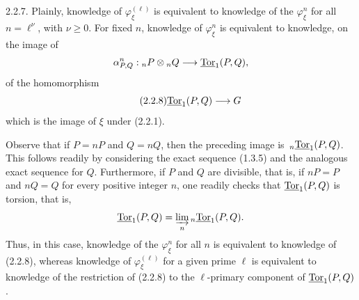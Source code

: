 2.2.7. Plainly, knowledge of $\varphi^{(\ell)}_\xi$ is equivalent
to knowledge of the $\varphi^n_\xi$ for all $n=\ell^\nu$, with
$\nu\geq0$.  For fixed $n$, knowledge of $\varphi^n_\xi$ is
equivalent to knowledge, on the image of
\[
 \alpha^n_{P,Q}:{}_nP\otimes{}_nQ\longrightarrow\uTor_1(P,Q),
\]
of the homomorphism
\begin{equation}\tag{2.2.8}
 \uTor_1(P,Q)\longrightarrow G
\end{equation}
which is the image of $\xi$ under (2.2.1).

Observe that if $P=nP$ and $Q=nQ$, then the preceding image is
$\,{}_n\uTor_1(P,Q)$.  This follows readily by considering the exact
sequence (1.3.5) and the analogous exact sequence for $Q$.
Furthermore, if $P$ and $Q$ are divisible, that is, if $nP=P$ and
$nQ=Q$ for every positive integer $n$, one readily checks that
$\uTor_1(P,Q)$ is torsion, that is,
\[
 \uTor_1(P,Q)=\varinjlim_n{}_{n}\uTor_1(P,Q).
\]
Thus, in this case, knowledge of the $\varphi^n_\xi$ for all $n$ is
equivalent to knowledge of (2.2.8), whereas knowledge of
$\varphi^{(\ell)}_\xi$ for a given prime $\ell$ is equivalent to
knowledge of the restriction of (2.2.8) to the $\ell$-primary
component of $\uTor_1(P,Q)$.

